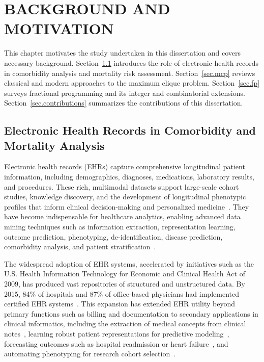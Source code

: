 \begingroup
\clearpage
\let\clearpage\relax
\vspace*{-40pt}
\chapter[BACKGROUND AND MOTIVATION]{BACKGROUND AND MOTIVATION}\label{sec.background}
\endgroup

This chapter motivates the study undertaken in this dissertation and covers necessary background.
Section~\ref{sec.ehr} introduces the role of electronic health records
in comorbidity analysis and mortality risk assessment.
Section~\ref{sec.mcp} reviews classical and modern approaches to the
maximum clique problem. Section~\ref{sec.fp} surveys fractional
programming and its integer and combinatorial extensions.
Section~\ref{sec.contributions} summarizes the contributions of this
dissertation.

\section{Electronic Health Records in Comorbidity and Mortality
Analysis}\label{sec.ehr}

Electronic health records (EHRs) capture comprehensive longitudinal
patient information, including demographics, diagnoses, medications,
laboratory results, and procedures. These rich, multimodal datasets
support large-scale cohort studies, knowledge discovery, and the
development of longitudinal phenotypic profiles that inform clinical
decision-making and personalized medicine~\citep{Jensen2012}. They
have become indispensable for healthcare analytics, enabling advanced
data mining techniques such as information extraction, representation
learning, outcome prediction, phenotyping, de-identification, disease
prediction, comorbidity analysis, and patient
stratification~\citep{Yadav2018,Sarwar2023}.

The widespread adoption of EHR systems, accelerated by initiatives
such as the U.S. Health Information Technology for Economic and
Clinical Health Act of 2009, has produced vast repositories of
structured and unstructured data. By 2015, 84\% of hospitals and 87\%
of office-based physicians had implemented certified EHR
systems~\citep{Shickel2018}. This expansion has extended EHR utility
beyond primary functions such as billing and documentation to
secondary applications in clinical informatics, including the
extraction of medical concepts from clinical notes~\citep{Sarwar2023},
learning robust patient representations for predictive
modeling~\citep{Shickel2018}, forecasting outcomes such as hospital
readmission or heart failure~\citep{Yadav2018}, and automating
phenotyping for research cohort selection~\citep{Jensen2012}.

